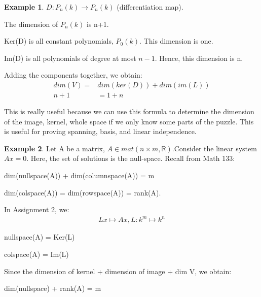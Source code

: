 \documentclass[a4paper, 12pt]{article}
\theoremstyle{definition}
\newtheorem{exmp}{Example}[section]
\theoremstyle{definition}
\theoremstyle{definition}
\theoremstyle{definition}
\newenvironment{enumerate_tight}{
	\begin{enumerate}
		\setlength{\itemsep}{0pt}
		\setlength{\parskip}{0pt}
	}{\end{enumerate}}
\newenvironment{itemize_tight}{
	\begin{itemize}
		\setlength{\itemsep}{0pt}
		\setlength{\parskip}{0pt}
	}{\end{itemize}}
\begin{document}
{\begin{exmp}
	$D: P_n(k) \rightarrow P_n(k)$ (differentiation map). 
	\begin{enumerate_tight}
		\item The dimension of $P_n(k)$ is n+1. 
		\item Ker(D) is all constant polynomials, $P_0(k)$. This dimension is one. 
		\item Im(D) is all polynomials of degree at most $n-1$. Hence, this dimension is n. 
		\item Adding the components together, we obtain: 
		\begin{align*}
			dim(V) = & dim(ker(D)) + dim(im(L)) \\ 
			n + 1 &  = 1 + n 
		\end{align*}
	\end{enumerate_tight}
\end{exmp}
This is really useful because we can use this formula to determine the dimension of the image, kernel, whole space if we only know some parts of the puzzle. This is useful for proving spanning, basis, and linear independence. 
\begin{exmp}
	Let A be a matrix, $A \in mat(n \times m, \mathbb{R}). $Consider the linear system $Ax = 0$. Here, the set of solutions is the null-space. Recall from Math 133: 
	\begin{itemize_tight}
		\item dim(nullspace(A)) + dim(columnspace(A)) = m 
		\item dim(colspace(A)) = dim(rowspace(A)) = rank(A). 
		\item In Assignment 2, we: 
		\begin{align*}
			Lx \mapsto Ax, L: k^m \mapsto k^n
		\end{align*}
		\begin{itemize_tight}
			\item nullspace(A) = Ker(L) 
			\item colspace(A) = Im(L)
			\item Since the dimension of kernel + dimension of image + dim V, we obtain: 
			\begin{itemize_tight}
				\item dim(nullspace) + rank(A) = m 
			\end{itemize_tight}  
		\end{itemize_tight} 
	\end{itemize_tight}
\end{exmp}

}
\end{document}
